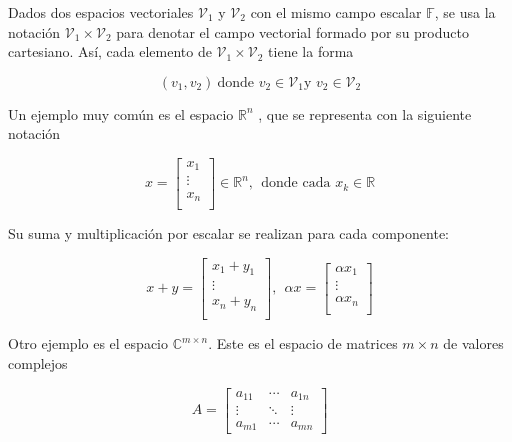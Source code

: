 Dados dos espacios vectoriales $\mathcal{V}_1$ y $\mathcal{V}_2$ con el mismo campo escalar $ \mathbb{F}$, se usa la notación $\mathcal{V}_1 \times \mathcal{V}_2$ para denotar el campo vectorial formado por su producto cartesiano. Así, cada elemento de  $\mathcal{V}_1 \times \mathcal{V}_2$ tiene la forma

\begin{equation*}
(v_1,v_2) \ \text{donde } v_2 \in \mathcal{V}_1 \text{y } v_2 \in \mathcal{V}_2 
\end{equation*}

Un ejemplo muy común es el espacio $\mathbb{R}^n$ , que se representa con la siguiente notación

\begin{equation*}
x = \left[ 
    \begin{array}{c}
        x_1 \\
        \vdots  \\
        x_n \\
    \end{array}
\right] \in \mathbb{R}^n, \ \ \text{donde cada } x_k \in \mathbb{R} 
\end{equation*}

Su suma y multiplicación por escalar se realizan para cada componente:

\begin{equation*}
x+y = \left[ 
    \begin{array}{c}

        x_1+y_1 \\
        \vdots  \\
        x_n + y_n \\
    \end{array}
\right], \ \ \alpha x = \left[ 
    \begin{array}{c}
        \alpha x_1 \\
        \vdots  \\
        \alpha x_n \\
    \end{array}
\right]
\end{equation*}


Otro ejemplo es el espacio $\mathbb{C}^{m\times n}$. Este es el espacio de matrices $m \times n$ de valores complejos

\begin{equation*}
A = \left[  \begin{array}{ccc}
    a_{11} & \cdots & a_{1n} \\
    \vdots & \ddots & \vdots \\
    a_{m1} & \cdots & a_{mn} 
\end{array}\right]
\end{equation*}

